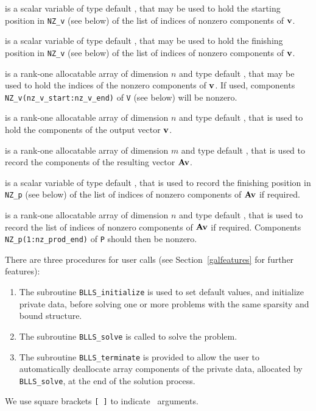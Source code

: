 \documentclass{galahad}
\newcommand{\packagename}{BLLS}
\begin{document}
\begin{description}

 is a scalar variable of type default \integer, that
may be used to hold the starting position in {\tt NZ\_v} (see below)
of the list of indices of nonzero components of ${\mathbf{v}}$.

 is a scalar variable of type default \integer, that
may be used to hold the finishing position in {\tt NZ\_v} (see below)
of the list of indices of nonzero components of ${\mathbf{v}}$.

 is a rank-one allocatable array of dimension $n$
and type default \integer, that may be used to hold the indices of the
nonzero components of ${\mathbf{v}}$. If used, components
{\tt NZ\_v(nz\_v\_start:nz\_v\_end)} of {\tt V} (see below) will be nonzero.

 is a rank-one allocatable array of dimension $n$
and type default \realdp, that is used to hold the components of the
output vector ${\mathbf{v}}$.

 is a rank-one allocatable array of dimension $m$
and type default \realdp, that is used to record the components of the
resulting vector ${\mathbf{A}} {\mathbf{v}}$.

 is a scalar variable of type default \integer, that
is used to record the finishing position in {\tt NZ\_p} (see below)
of the list of indices of nonzero components of ${\mathbf{A}} {\mathbf{v}}$ if required.

 is a rank-one allocatable array of dimension $n$
and type default \integer, that is used to record the list of
indices of nonzero components of ${\mathbf{A}} {\mathbf{v}}$ if required. Components
{\tt NZ\_p(1:nz\_prod\_end)} of {\tt P} should then be nonzero.

\end{description}


\galarguments
There are three procedures for user calls
(see Section~\ref{galfeatures} for further features):

\begin{enumerate}
\item The subroutine
      {\tt \packagename\_initialize}
      is used to set default values, and initialize private data,
      before solving one or more problems with the
      same sparsity and bound structure.
\item The subroutine
      {\tt \packagename\_solve}
      is called to solve the problem.
\item The subroutine
      {\tt \packagename\_terminate}
      is provided to allow the user to automatically deallocate array
       components of the private data, allocated by
       {\tt \packagename\_solve},
       at the end of the solution process.
\end{enumerate}
We use square brackets {\tt [ ]} to indicate \optional\ arguments.
\end{document}

